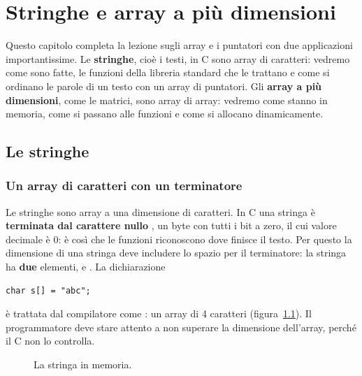 \chapter{Stringhe e array a più dimensioni}
\label{chap:stringhe}

Questo capitolo completa la lezione sugli array e i puntatori con due
applicazioni importantissime. Le \textbf{stringhe}, cioè i testi, in C sono
array di caratteri: vedremo come sono fatte, le funzioni della libreria
standard che le trattano e come si ordinano le parole di un testo con un
array di puntatori. Gli \textbf{array a più dimensioni}, come le matrici,
sono array di array: vedremo come stanno in memoria, come si passano alle
funzioni e come si allocano dinamicamente.

\section{Le stringhe}

\subsection{Un array di caratteri con un terminatore}

Le stringhe sono array a una dimensione di caratteri. In C una stringa è
\textbf{terminata dal carattere nullo} , un byte con
tutti i bit a zero, il cui valore decimale è 0: è così che le funzioni
riconoscono dove finisce il testo. Per questo la dimensione di una stringa
deve includere lo spazio per il terminatore: la stringa  ha
\textbf{due} elementi,  e . La
dichiarazione

\begin{lstlisting}[style=c]
char s[] = "abc";
\end{lstlisting}

è trattata dal compilatore come
: un array di 4
caratteri (figura~\ref{fig:stringa}). Il programmatore deve stare attento a
non superare la dimensione dell'array, perché il C non lo controlla.

\begin{figure}[H]
  \centering
  \caption{La stringa  in memoria.}
  \label{fig:stringa}
\end{figure}

